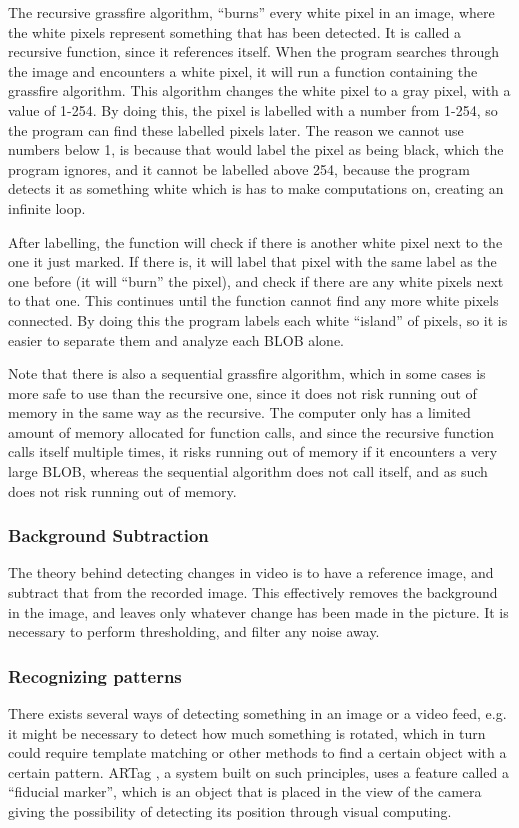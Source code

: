 The recursive grassfire algorithm, “burns” every white pixel in an image, where the white pixels represent something that has been detected. It is called a recursive function, since it references itself. When the program searches through the image and encounters a white pixel, it will run a function containing the grassfire algorithm. This algorithm changes the white pixel to a gray pixel, with a value of 1-254. By doing this, the pixel is labelled with a number from 1-254, so the program can find these labelled pixels later. The reason we cannot use numbers below 1, is because that would label the pixel as being black, which the program ignores, and it cannot be labelled above 254, because the program detects it as something white which is has to make computations on, creating an infinite loop.

After labelling, the function will check if there is another white pixel next to the one it just marked. If there is, it will label that pixel with the same label as the one before (it will “burn” the pixel), and check if there are any white pixels next to that one. This continues until the function cannot find any more white pixels connected.
By doing this the program labels each white “island” of pixels, so it is easier to separate them and analyze each BLOB alone.

Note that there is also a sequential grassfire algorithm, which in some cases is more safe to use than the recursive one, since it does not risk running out of memory in the same way as the recursive. The computer only has a limited amount of memory allocated for function calls, and since the recursive function calls itself multiple times, it risks running out of memory if it encounters a very large BLOB, whereas the sequential algorithm does not call itself, and as such does not risk running out of memory. \parencite{Moeslund2012}

\subsubsection{Background Subtraction} \label{sec:BGSub}
The theory behind detecting changes in video is to have a reference image, and subtract that from the recorded image. This effectively removes the background in the image, and leaves only whatever change has been made in the picture. It is necessary to perform thresholding, and filter any noise away.

\subsubsection{Recognizing patterns} \label{sec:detect}
There exists several ways of detecting something in an image or a video feed, e.g. it might be necessary to detect how much something is rotated, which in turn could require template matching or other methods to find a certain object with a certain pattern. 
ARTag \parencite{Fiala2005}, a system built on such principles, uses a feature called a “fiducial marker”, which is an object that is placed in the view of the camera giving the possibility of detecting its position through visual computing.

